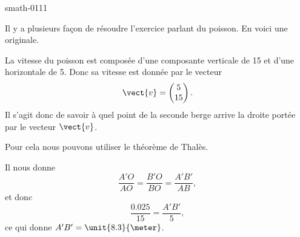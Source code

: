 
\begin{corrige}{smath-0111}

    Il y a plusieurs façon de résoudre l'exercice parlant du poisson. En voici une originale. 

    La vitesse du poisson est composée d'une composante verticale de \unit{15}{\kilo\meter\per\hour} et d'une horizontale de \unit{5}{\kilo\meter\per\hour}. Donc sa vitesse est donnée par le vecteur
    \begin{equation}
        \vect{ v }=\begin{pmatrix}
            5    \\ 
            15    
        \end{pmatrix}.
    \end{equation}
    Il s'agit donc de savoir à quel point de la seconde berge arrive la droite portée par le vecteur \( \vect{ v }\).

    \begin{center}

    \end{center}
    Pour cela nous pouvons utiliser le théorème de Thalès.

    \begin{center}

    \end{center}

    Il nous donne 
    \begin{equation}
        \frac{ A'O }{ AO }=\frac{ B'O }{ BO }=\frac{ A'B' }{ AB },
    \end{equation}
    et donc
    \begin{equation}
        \frac{ 0.025 }{ 15 }=\frac{ A'B' }{ 5 },
    \end{equation}
    ce qui donne \( A'B'=\unit{8.3}{\meter}\).

\end{corrige}
